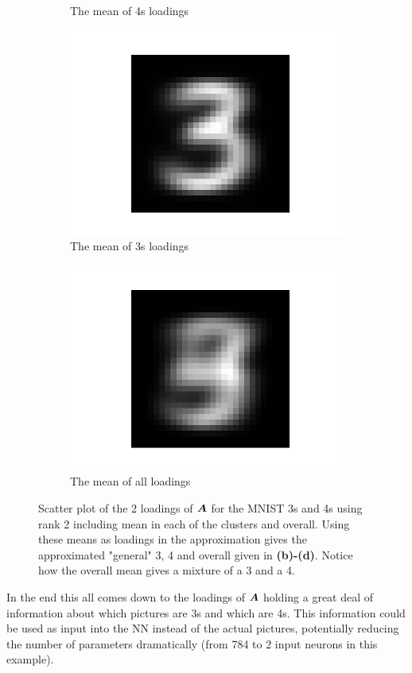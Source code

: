 \begin{figure}
\begin{subfigure}{0.3\linewidth}
        \caption{The mean of 4s loadings}
    \end{subfigure}
    \begin{subfigure}{0.3\linewidth}
    \centering
        \includegraphics[width=.5\linewidth]{Pics/06_results/general3.png}
        \caption{The mean of 3s loadings}
    \end{subfigure}
    \begin{subfigure}{0.3\linewidth}
    \centering
        \includegraphics[width=.5\linewidth]{Pics/06_results/general.png}
        \caption{The mean of all loadings}
        \label{Hej}
    \end{subfigure}
    \caption{Scatter plot of the 2 loadings of $\boldsymbol{A}$ for the MNIST 3s and 4s using rank 2 including mean in each of the clusters and overall. Using these means as loadings in the approximation gives the approximated "general" 3, 4 and overall given in \textbf{(b)-(d)}. Notice how the overall mean gives a mixture of a 3 and a 4.}
    \label{fig:loadingsOfA}
\end{figure}

In the end this all comes down to the loadings of $\boldsymbol{A}$ holding a great deal of information about which pictures are 3s and which are 4s. This information could be used as input into the NN instead of the actual pictures, potentially reducing the number of parameters dramatically (from 784 to 2 input neurons in this example).

